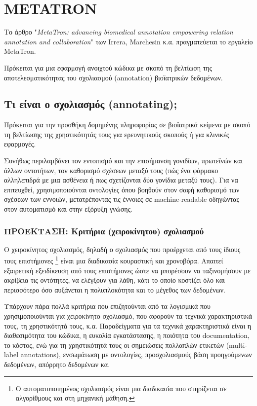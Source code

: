 \section{METATRON}
    Το άρθρο "\textit{MetaTron: advancing biomedical annotation empowering relation annotation and collaboration}" των Irrera, Marchesin κ.α. πραγματεύεται το εργαλείο MetaTron.

    Πρόκειται για μια εφαρμογή ανοιχτού κώδικα με σκοπό τη βελτίωση της αποτελεσματικότητας του σχολιασμού (annotation) βιοϊατρικών δεδομένων. \cite{MetaTron}

    \subsection{Τι είναι ο σχολιασμός (annotating);}
        Πρόκειται για την προσθήκη δομημένης πληροφορίας σε βιοϊατρικά κείμενα με σκοπό τη βελτίωσης της χρηστικότητάς τους για ερευνητικούς σκοπούς ή για κλινικές εφαρμογές.

        Συνήθως περιλαμβάνει τον εντοπισμό και την επισήμανση γονιδίων, πρωτεϊνών και άλλων οντοτήτων, τον καθορισμό σχέσεων μεταξύ τους (πώς ένα φάρμακο αλληλεπιδρά με μια ασθένεια ή πως σχετίζονται δύο γονίδια μεταξύ τους).
        Για να επιτευχθεί, χρησιμοποιούνται οντολογίες όπου βοηθούν στον σαφή καθορισμό των σχέσεων των εννοιών, μετατρέποντας τις έννοιες σε machine-readable οδηγώντας στον αυτοματισμό και στην εξόρυξη γνώσης.

        \subsubsection{ΠΡΟΕΚΤΑΣΗ: Κριτήρια (χειροκίνητου) σχολιασμού}
            Ο χειροκίνητος σχολιασμός, δηλαδή ο σχολιασμός που προέρχεται από τους ίδιους τους επιστήμονες \footnote{Ο αυτοματοποιημένος σχολιασμός είναι μια διαδικασία που στηρίζεται σε αλγορίθμους και στη μηχανική μάθηση.} είναι μια διαδικασία κουραστική και χρονοβόρα.
            Απαιτεί εξαιρετική εξειδίκευση από τους επιστήμονες ώστε να μπορέσουν να ταξινομήσουν με ακρίβεια τις οντότητες, να ελέγξουν για λάθη, κάτι το οποίο κοστίζει όλο και περισσότερο όσο αυξάνεται η πολυπλοκότητα και το μέγεθος των δεδομένων.

            Υπάρχουν πάρα πολλά κριτήρια που επιζητούνται από τα λογισμικά που χρησιμοποιούνται για χειροκίνητο σχολιασμό, που αφορούν τα τεχνικά χαρακτηριστικά τους, τη χρηστικότητά τους, κ.α.
            Παραδείγματα για τα τεχνικά χαρακτηριστικά είναι η διαθεσιμότητα του κώδικα, η ευκολία εγκατάστασης, η ποιότητα του documentation, το κόστος, ενώ για τη χρηστικότητά τους οι σημειώσεις πολλαπλών ετικετών (multi-label annotations), ενσωμάτωση με οντολογίες, προσχολιασμούς βάση προηγούμενων δεδομένων, απόρρητο δεδομένων κα.

